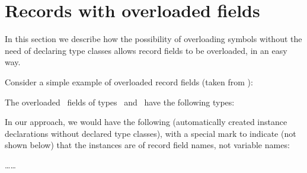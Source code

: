 \section{Records with overloaded fields}
\label{sec:overloaded-record-fields}

In this section we describe how the possibility of overloading symbols
without the need of declaring type classes allows record fields to be
overloaded, in an easy way.

Consider a simple example of overloaded record fields (taken from
\cite{overloaded-record-fields-in-ghc}):

\progb{\data\ \Address\ \= = \Address\ \= \{ \id\ :: \Int, \address\ \= :: \String\ \= \kill
\data\ \Person\  \> = \Person\  \> \{ \id\ :: \Int, \name\    \> :: \String\ \>\}\\
\data\ \Address\ \> = \Address\ \> \{ \id\ :: \Int, \address\ \> :: \String\ \>\}
}

The overloaded \id\ fields of types \Person\ and \Address\ have the
following types:

\progb{\id\ :: \= \kill
\id\ :: \Person\  \>$\rightarrow$ \Int\\
\id\ :: \Address\ \>$\rightarrow$ \Int
}

In our approach, we would have the following (automatically created
instance declarations without declared type classes), with a special
mark to indicate (not shown below) that the instances are of record
field names, not variable names:


\ldots \ldots 

